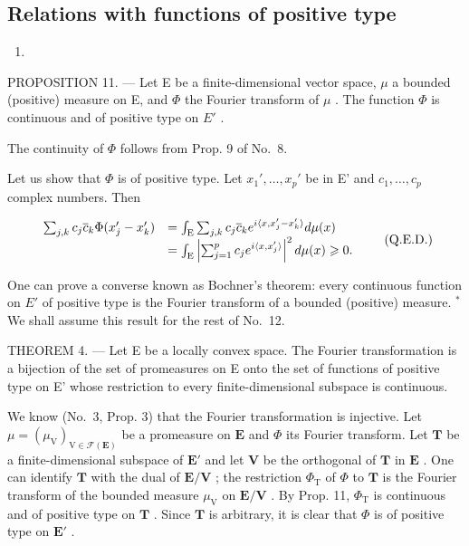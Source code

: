 \subsection{Relations with functions of positive type}

\begin{enumerate}
\def\labelenumi{(\arabic{enumi})}
\setcounter{enumi}{65}
\tightlist
\item
\end{enumerate}

PROPOSITION 11. --- Let E be a finite-dimensional vector space, \(\mu\) a bounded (positive) measure on E, and \(\Phi\) the Fourier transform of \(\mu\) . The function \(\Phi\) is continuous and of positive type on \(E'\) .

The continuity of \(\Phi\) follows from Prop. 9 of No.~8.

Let us show that \(\Phi\) is of positive type. Let \(x_1', \ldots, x_p'\) be in E' and \(c_1, \ldots, c_p\) complex numbers. Then

\[
\begin{array}{r l} \sum_ {j, k} c _ {j} \overline {{{c}}} _ {k} \Phi (x _ {j} ^ {\prime} - x _ {k} ^ {\prime}) & = \int_ {\mathrm{E}} \sum_ {j, k} c _ {j} \overline {{{c}}} _ {k} e ^ {i \langle x, x _ {j} ^ {\prime} - x _ {k} ^ {\prime} \rangle} d \mu (x) \\ & = \int_ {\mathrm{E}} \left| \sum_ {j = 1} ^ {p} c _ {j} e ^ {i \langle x, x _ {j} ^ {\prime} \rangle} \right| ^ {2} d \mu (x) \geqslant 0. \end{array}\tag{Q.E.D.}
\]

One can prove a converse known as Bochner's theorem: every continuous function on \(E'\) of positive type is the Fourier transform of a bounded (positive) measure. \(^{*}\) We shall assume this result for the rest of No.~12.

THEOREM 4. --- Let E be a locally convex space. The Fourier transformation is a bijection of the set of promeasures on E onto the set of functions of positive type on E' whose restriction to every finite-dimensional subspace is continuous.

We know (No.~3, Prop. 3) that the Fourier transformation is injective. Let \(\mu = (\mu_{\mathrm{V}})_{\mathrm{V}\in \mathcal{F}(\mathbf{E})}\) be a promeasure on \(\mathbf{E}\) and \(\Phi\) its Fourier transform. Let \(\mathbf{T}\) be a finite-dimensional subspace of \(\mathbf{E}'\) and let \(\mathbf{V}\) be the orthogonal of \(\mathbf{T}\) in \(\mathbf{E}\) . One can identify \(\mathbf{T}\) with the dual of \(\mathbf{E} / \mathbf{V}\) ; the restriction \(\Phi_{\mathrm{T}}\) of \(\Phi\) to \(\mathbf{T}\) is the Fourier transform of the bounded measure \(\mu_{\mathrm{V}}\) on \(\mathbf{E} / \mathbf{V}\) . By Prop. 11, \(\Phi_{\mathrm{T}}\) is continuous and of positive type on \(\mathbf{T}\) . Since \(\mathbf{T}\) is arbitrary, it is clear that \(\Phi\) is of positive type on \(\mathbf{E}'\) .

